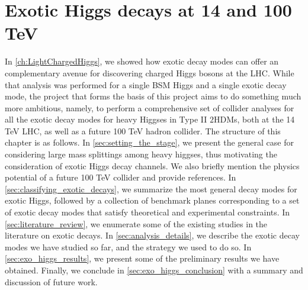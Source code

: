 \chapter{Exotic Higgs decays at 14 and 100 TeV}\label{ch:ExoticHiggs}

In \autoref{ch:LightChargedHiggs}, we showed how exotic decay modes can offer an complementary avenue for discovering charged Higgs bosons at the LHC. While that analysis was performed for a single BSM Higgs and a single exotic decay mode, the project that forms the basis of this project aims to do something much more ambitious, namely, to perform a comprehensive set of collider analyses for all the exotic decay modes for heavy Higgses in Type II $2$HDMs, both at the 14 TeV LHC, as well as a future 100 TeV hadron collider. The structure of this chapter is as follows. In \autoref{sec:setting_the_stage}, we present the general case for considering large mass splittings among heavy higgses, thus motivating the consideration of exotic Higgs decay channels. We also briefly mention the physics potential of a future 100 TeV collider and provide references. In \autoref{sec:classifying_exotic_decays}, we summarize the most general decay modes for exotic Higgs, followed by a collection of benchmark planes corresponding to a set of exotic decay modes that satisfy theoretical and experimental constraints. In \autoref{sec:literature_review}, we enumerate some of the existing studies in the literature on exotic decays. In \autoref{sec:analysis_details}, we describe the exotic decay modes we have studied so far, and the strategy we used to do so. In \autoref{sec:exo_higgs_results}, we present some of the preliminary results we have obtained. Finally, we conclude in \autoref{sec:exo_higgs_conclusion} with a summary and discussion of future work.

